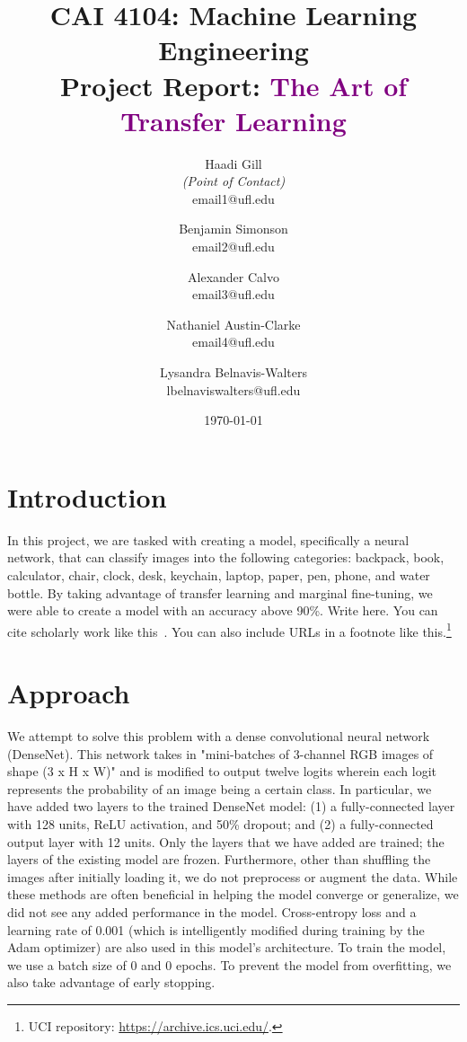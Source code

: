 \documentclass[10pt]{article}
\title{CAI 4104: Machine Learning Engineering\\
	\large Project Report:  {\textcolor{purple}{The Art of Transfer Learning}}} %
\author{
        Haadi Gill \\{\em (Point of Contact)} \\
        email1@ufl.edu\\
        \and
        Benjamin Simonson \\
        email2@ufl.edu\\
        \and
        Alexander Calvo \\
        email3@ufl.edu\\
        \and
        Nathaniel Austin-Clarke \\
        email4@ufl.edu\\
        \and
        Lysandra Belnavis-Walters \\
        lbelnaviswalters@ufl.edu\\
}
\date{\today}
\begin{document}

\maketitle






\section{Introduction}

In this project, we are tasked with creating a model, specifically a neural network, that can classify images into the following categories: backpack, book, calculator, chair, clock, desk, keychain, laptop, paper, pen, phone, and water bottle. By taking advantage of transfer learning and marginal fine-tuning, we were able to create a model with an accuracy above 90\%.
Write here. You can cite scholarly work like this~\cite{murphy2022probabilistic}. You can also include URLs in a footnote like this.\footnote{UCI repository: \url{https://archive.ics.uci.edu/}.}




\section{Approach}

We attempt to solve this problem with a dense convolutional neural network (DenseNet). This network takes in "mini-batches of 3-channel RGB images of shape (3 x H x W)" \cite{https://pytorch.org/hub/pytorch_vision_densenet/} and is modified to output twelve logits wherein each logit represents the probability of an image being a certain class. In particular, we have added two layers to the trained DenseNet model: (1) a fully-connected layer with 128 units, ReLU activation, and  50\% dropout; and (2) a fully-connected output layer with 12 units. Only the layers that we have added are trained; the layers of the existing model are frozen. Furthermore, other than shuffling the images after initially loading it, we do not preprocess or augment the data. While these methods are often beneficial in helping the model converge or generalize, we did not see any added performance in the model.
Cross-entropy loss and a learning rate of 0.001 (which is intelligently modified during training by the Adam optimizer) are also used in this model's architecture.
To train the model, we use a batch size of 0 and 0 epochs. To prevent the model from overfitting, we also take advantage of early stopping.
\end{document}
